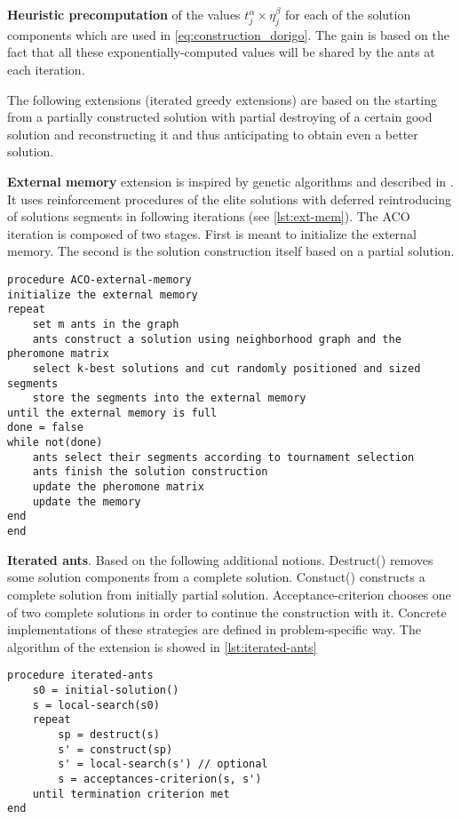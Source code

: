 \textbf{Heuristic precomputation} of the values $t_j^\alpha \times \eta_j^\beta$ for each of the solution components which are used in \eqref{eq:construction_dorigo}. The gain is based on the fact that all these exponentially-computed values will be shared by the ants at each iteration.

The following extensions (iterated greedy extensions) are based on the starting from a partially constructed solution with partial destroying of a certain good solution and reconstructing it and thus anticipating to obtain even a better solution.

\textbf{External memory} extension is inspired by genetic algorithms and described in \cite{external_memory}. It uses reinforcement procedures of the elite solutions with deferred reintroducing of solutions segments in following iterations (see \ref{lst:ext-mem}). The ACO iteration is composed of two stages. First is meant to initialize the external memory. The second is the solution construction itself based on a partial solution.

\begin{minipage}[c, breaklines=true]{0.95\textwidth}
\begin{lstlisting}[caption={External memory iteration pseudo-code}, label={lst:ext-mem}]
procedure ACO-external-memory
initialize the external memory
repeat
	set m ants in the graph
	ants construct a solution using neighborhood graph and the pheromone matrix
	select k-best solutions and cut randomly positioned and sized segments
	store the segments into the external memory
until the external memory is full
done = false
while not(done)
	ants select their segments according to tournament selection
	ants finish the solution construction
	update the pheromone matrix
	update the memory
end
end
\end{lstlisting}
\end{minipage}

\textbf{Iterated ants}. Based on the following additional notions. Destruct() removes some solution components from a complete solution. Constuct() constructs a complete solution from initially partial solution. Acceptance-criterion chooses one of two complete solutions in order to continue the construction with it. Concrete implementations of these strategies are defined in problem-specific way. The algorithm of the extension is showed in \ref{lst:iterated-ants} 

\begin{minipage}[c, breaklines=true]{0.95\textwidth}
\begin{lstlisting}[caption={General ACO pseudo-code}, label={lst:iterated-ants}]
procedure iterated-ants
	s0 = initial-solution()
	s = local-search(s0)
	repeat
		sp = destruct(s)
		s' = construct(sp)
		s' = local-search(s') // optional
		s = acceptances-criterion(s, s')
	until termination criterion met
end
\end{lstlisting}
\end{minipage}

